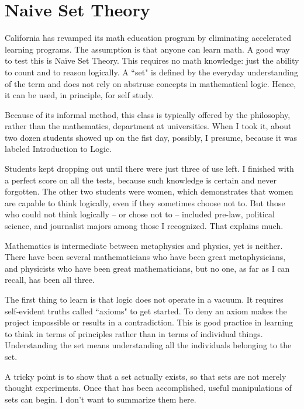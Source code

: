\section{Naive Set Theory}

\label{sec:NaiveSetTheory}

California has revamped its math education program by eliminating accelerated learning programs. The assumption is that anyone can learn math. A good way to test this is Naïve Set Theory. This requires no math knowledge: just the ability to count and to reason logically. A ``set" is defined by the everyday understanding of the term and does not rely on abstruse concepts in mathematical logic. Hence, it can be used, in principle, for self study.

Because of its informal method, this class is typically offered by the philosophy, rather than the mathematics, department at universities. When I took it, about two dozen students showed up on the fist day, possibly, I presume, because it was labeled Introduction to Logic.

Students kept dropping out until there were just three of use left. I finished with a perfect score on all the tests, because such knowledge is certain and never forgotten. The other two students were women, which demonstrates that women are capable to think logically, even if they sometimes choose not to. But those who could not think logically – or chose not to – included pre-law, political science, and journalist majors among those I recognized. That explains much.

Mathematics is intermediate between metaphysics and physics, yet is neither. There have been several mathematicians who have been great metaphysicians, and physicists who have been great mathematicians, but no one, as far as I can recall, has been all three.

The first thing to learn is that logic does not operate in a vacuum. It requires self-evident truths called ``axioms" to get started. To deny an axiom makes the project impossible or results in a contradiction. This is good practice in learning to think in terms of principles rather than in terms of individual things. Understanding the set means understanding all the individuals belonging to the set.

A tricky point is to show that a set actually exists, so that sets are not merely thought experiments. Once that has been accomplished, useful manipulations of sets can begin. I don't want to summarize them here.

